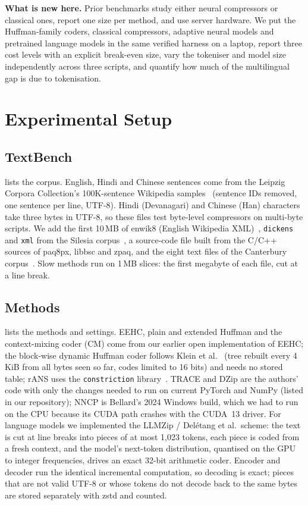 \documentclass[conference]{IEEEtran}
\begin{document}
\textbf{What is new here.} Prior benchmarks study either neural compressors or classical ones, report one size per method, and use server hardware. We put the Huffman-family coders, classical compressors, adaptive neural models and pretrained language models in the same verified harness on a laptop, report three cost levels with an explicit break-even size, vary the tokeniser and model size independently across three scripts, and quantify how much of the multilingual gap is due to tokenisation.

\section{Experimental Setup}
\subsection{TextBench}
 lists the corpus. English, Hindi and Chinese sentences come from the Leipzig Corpora Collection's 100K-sentence Wikipedia samples~\cite{goldhahn2012leipzig} (sentence IDs removed, one sentence per line, UTF-8). Hindi (Devanagari) and Chinese (Han) characters take three bytes in UTF-8, so these files test byte-level compressors on multi-byte scripts. We add the first 10\,MB of enwik8 (English Wikipedia XML)~\cite{mahoney_ltcb}, \texttt{dickens} and \texttt{xml} from the Silesia corpus~\cite{deorowicz2003silesia}, a source-code file built from the C/C++ sources of paq8px, libbsc and zpaq, and the eight text files of the Canterbury corpus~\cite{arnold1997canterbury}. Slow methods run on 1\,MB slices: the first megabyte of each file, cut at a line break.



\subsection{Methods}
 lists the methods and settings. EEHC, plain and extended Huffman and the context-mixing coder (CM) come from our earlier open implementation of EEHC; the block-wise dynamic Huffman coder follows Klein et al.~\cite{klein2024dynhuff} (tree rebuilt every 4\,KiB from all bytes seen so far, codes limited to 16 bits) and needs no stored table; rANS uses the \texttt{constriction} library~\cite{bamler2022constriction}. TRACE and DZip are the authors' code with only the changes needed to run on current PyTorch and NumPy (listed in our repository); NNCP is Bellard's 2024 Windows build, which we had to run on the CPU because its CUDA path crashes with the CUDA~13 driver. For language models we implemented the LLMZip / Del\'etang et al.\ scheme: the text is cut at line breaks into pieces of at most 1,023 tokens, each piece is coded from a fresh context, and the model's next-token distribution, quantised on the GPU to integer frequencies, drives an exact 32-bit arithmetic coder. Encoder and decoder run the identical incremental computation, so decoding is exact; pieces that are not valid UTF-8 or whose tokens do not decode back to the same bytes are stored separately with zstd and counted.
\end{document}
